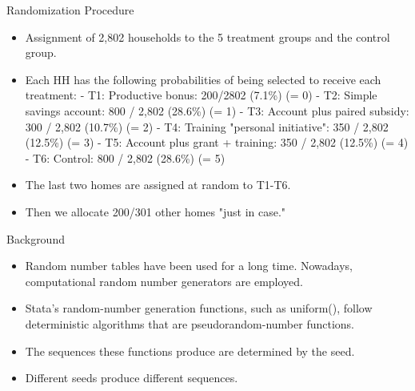 \documentclass[aspectratio=169]{beamer}
\begin{document}
\begin{frame}{Randomization Procedure}
\begin{multicols}{2}	
	
	\begin{itemize}[<default overlay specification>]
		\item<1>  Assignment of 2,802 households to the 5 treatment groups and the control group.
		\item<1> Each HH has the following probabilities of being selected to receive each treatment:
			\newline - T1: Productive bonus: 200/2802 (7.1\%) (= 0)
			\newline - T2: Simple savings account: 800 / 2,802 (28.6\%) (= 1)
			\newline - T3: Account plus paired subsidy: 300 / 2,802 (10.7\%) (= 2)
			\newline - T4: Training "personal initiative": 350 / 2,802 (12.5\%) (= 3)
			\newline - T5: Account plus grant + training: 350 / 2,802 (12.5\%) (= 4)
			\newline - T6: Control: 800 / 2,802 (28.6\%) (= 5)
	   \item<1> The last two homes are assigned at random to T1-T6.
	   \item<1> Then we allocate 200/301 other homes "just in case."

	\end{itemize}
	
\end{multicols}
\end{frame}


\begin{frame}{Background}

\begin{itemize}[<default overlay specification>]
	\item<1>  Random number tables have been used for a long time. Nowadays, computational random number generators are employed.

	\item<1>  Stata’s random-number generation functions, such as uniform(), follow deterministic algorithms that are pseudorandom-number functions. 
	\item<1>  The sequences these functions produce are determined by the seed.
	\item<1>  Different seeds produce different sequences.
\end{itemize}

\end{frame}
\end{document}
